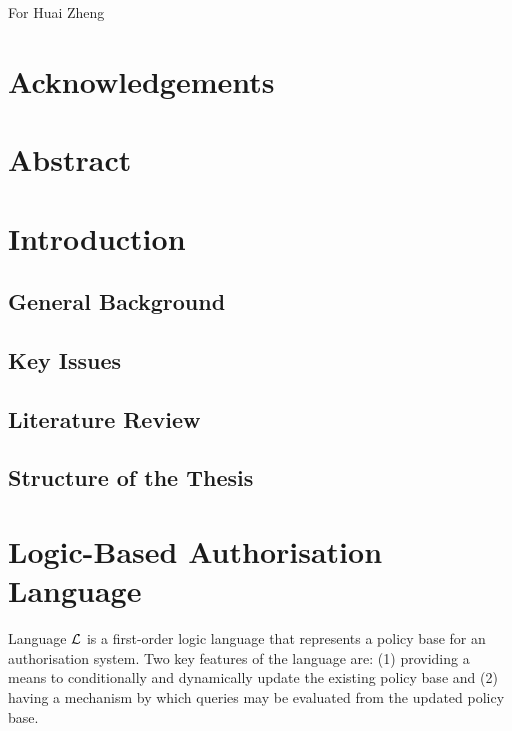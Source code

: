 \documentclass[11pt]{report}
\newenvironment{vdedication}
{
  \thispagestyle{empty}
  \vspace*{\stretch{2}}
  \em
  \begin{center}
}
{
  \end{center}
  \vspace*{\stretch{10}}
  \cleardoublepage
}
\begin{document}
  \begin{vdedication}
    For Huai Zheng
  \end{vdedication}

  \chapter*{Acknowledgements}

  \chapter*{Abstract}

  \tableofcontents
  \listoffigures
  \listoftables
  \newpage


  \chapter{Introduction}
    \label{chap-intro}

    \section{General Background}
      \label{sect-intro-genbg}

    \section{Key Issues}
      \label{sect-intro-keyis}

    \section{Literature Review}
      \label{sect-intro-litre}

    \section{Structure of the Thesis}
      \label{sect-intro-struc}

  \chapter{Logic-Based Authorisation Language}
    \label{chap-langl}

    Language $\cal{L}$ is a first-order logic language that represents a
    policy base for an authorisation system. Two key features of the
    language are: (1) providing a means to conditionally and dynamically
    update the existing policy base and (2) having a mechanism by which
    queries may be evaluated from the updated policy base.
\end{document}
